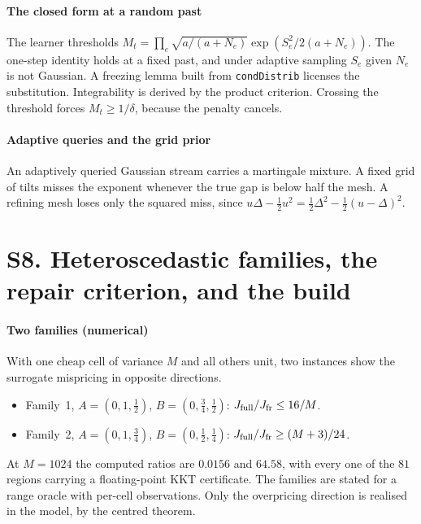
\paragraph{The closed form at a random past} The learner thresholds
$M_{t}=\prod_{e}\sqrt{a/(a+N_{e})}\exp(S_{e}^{2}/2(a+N_{e}))$. The one-step identity holds at a
fixed past, and under adaptive sampling $S_{e}$ given $N_{e}$ is not Gaussian. A freezing lemma
built from \texttt{condDistrib} licenses the substitution. Integrability is derived by the
product criterion. Crossing the threshold forces $M_{t}\ge1/\delta$, because the penalty
cancels.


\paragraph{Adaptive queries and the grid prior} An adaptively queried Gaussian stream carries a
martingale mixture. A fixed grid of tilts misses the exponent whenever the true gap is below
half the mesh. A refining mesh loses only the squared miss, since
$u\Delta-\frac12u^{2}=\frac12\Delta^{2}-\frac12(u-\Delta)^{2}$.


\section{S8. Heteroscedastic families, the repair criterion, and the build}

\paragraph{Two families (numerical)} With one cheap cell of variance $M$ and all others unit,
two instances show the surrogate mispricing in opposite directions.
\begin{itemize}
\item Family~1, $A=(0,1,\frac12)$, $B=(0,\frac34,\frac12)$: $J_{\rm full}/J_{\rm fr}\le16/M$.
\item Family~2, $A=(0,1,\frac34)$, $B=(0,\frac12,\frac14)$: $J_{\rm full}/J_{\rm fr}\ge(M+3)/24$.
\end{itemize}
At $M=1024$ the computed ratios are $0.0156$ and $64.58$, with every one of the $81$ regions
carrying a floating-point KKT certificate. \NUM{} The families are stated for a range oracle
with per-cell observations. Only the overpricing direction is realised in the model, by the
centred theorem.

